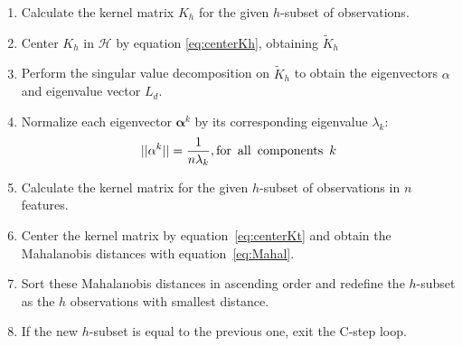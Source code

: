 \documentclass[preprint,12pt]{elsarticle}
\begin{document}
\begin{itemize}
		\begin{enumerate}
			\item Calculate the kernel matrix $K_h$ for the given $h$-subset of observations.
			\item Center $K_h$ in $\mathcal{H}$ by equation \ref{eq:centerKh}, obtaining $\tilde{K}_h$
			\item Perform the singular value decomposition on $\tilde{K}_h$ to obtain the eigenvectors $\alpha$ and eigenvalue vector $L_d$.
			\item Normalize each eigenvector $\mathbf{\alpha}^k$ by its corresponding eigenvalue $\lambda_k$:
			\begin{equation}
			||\mathbf{\alpha}^k|| = \frac{1}{n\lambda_k}, \mathrm{for \enskip all \enskip components \enskip}k
			\end{equation}
			\item Calculate the kernel matrix for the given $h$-subset of observations in $n$ features.
			\item Center the kernel matrix by equation~\eqref{eq:centerKt} and obtain the Mahalanobis distances with equation~\eqref{eq:Mahal}.
			\item Sort these Mahalanobis distances in ascending order and redefine the $h$-subset as the $h$ observations with smallest distance.
			\item If the new $h$-subset is equal to the previous one, exit the C-step loop.
		\end{enumerate}
		
		

\end{itemize}
\end{document}
